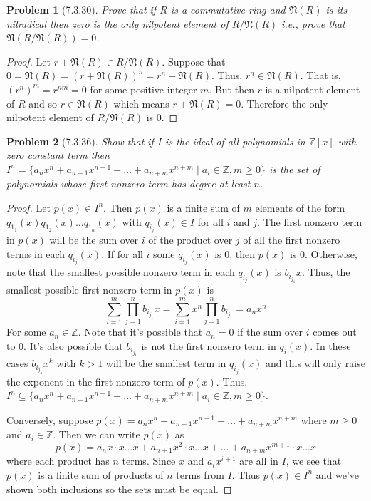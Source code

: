 \documentclass{article}
\newtheorem{problem}{Problem}
\begin{document}
\begin{problem}[7.3.30]
Prove that if $R$ is a commutative ring and $\mathfrak{N}(R)$ is its nilradical then zero is the only nilpotent element of $R/\mathfrak{N}(R)$ i.e., prove that $\mathfrak{N}(R/\mathfrak{N}(R)) = 0$.
\end{problem}
\begin{proof}
Let $r + \mathfrak{N}(R) \in R/\mathfrak{N}(R)$. Suppose that $0 = \mathfrak{N}(R) = (r + \mathfrak{N}(R))^n = r^n + \mathfrak{N}(R)$. Thus, $r^n \in \mathfrak{N}(R)$. That is, $(r^n)^m = r^{nm} = 0$ for some positive integer $m$. But then $r$ is a nilpotent element of $R$ and so $r \in \mathfrak{N}(R)$ which means $r + \mathfrak{N}(R) = 0$. Therefore the only nilpotent element of $R/\mathfrak{N}(R)$ is $0$.
\end{proof}

\begin{problem}[7.3.36]
Show that if $I$ is the ideal of all polynomials in $\mathbb{Z}[x]$ with zero constant term then $I^n = \{a_nx^n + a_{n+1}x^{n+1} + \dots + a_{n+m}x^{n+m} \mid a_i \in \mathbb{Z}, m \geq 0\}$ is the set of polynomials whose first nonzero term has degree at least $n$.
\end{problem}
\begin{proof}
Let $p(x) \in I^n$. Then $p(x)$ is a finite sum of $m$ elements of the form $q_{1_1}(x)q_{1_2}(x) \dots q_{1_n}(x)$ with $q_{i_j}(x) \in I$ for all $i$ and $j$. The first nonzero term in $p(x)$ will be the sum over $i$ of the product over $j$ of all the first nonzero terms in each $q_{i_j}(x)$. If for all $i$ some $q_{i_j}(x)$ is $0$, then $p(x)$ is $0$. Otherwise, note that the smallest possible nonzero term in each $q_{i_j}(x)$ is $b_{i_{j_1}}x$. Thus, the smallest possible first nonzero term in $p(x)$ is
\[
\sum_{i=1}^m \prod_{j=1}^n b_{i_{j_1}}x = \sum_{i=1}^m x^n \prod_{j=1}^n b_{i_{j_1}} = a_nx^n
\]
For some $a_n \in \mathbb{Z}$. Note that it's possible that $a_n = 0$ if the sum over $i$ comes out to $0$. It's also possible that $b_{i_{j_1}}$ is not the first nonzero term in $q_i(x)$. In these cases $b_{i_{j_k}}x^k$ with $k > 1$ will be the smallest term in $q_{i_j}(x)$ and this will only raise the exponent in the first nonzero term of $p(x)$. Thus, $I^n \subseteq \{a_nx^n + a_{n+1}x^{n+1} + \dots + a_{n+m}x^{n+m} \mid a_i \in \mathbb{Z}, m \geq 0\}$.

Conversely, suppose $p(x) = a_nx^n + a_{n+1}x^{n+1} + \dots + a_{n+m}x^{n+m}$ where $m \geq 0$ and $a_i \in \mathbb{Z}$. Then we can write $p(x)$ as
\[
p(x) = a_nx \cdot x \dots x + a_{n+1}x^2 \cdot x \dots x + \dots + a_{n+m}x^{m+1} \cdot x \dots x
\]
where each product has $n$ terms. Since $x$ and $a_ix^{i+1}$ are all in $I$, we see that $p(x)$ is a finite sum of products of $n$ terms from $I$. Thus $p(x) \in I^n$ and we've shown both inclusions so the sets must be equal.
\end{proof}
\end{document}
